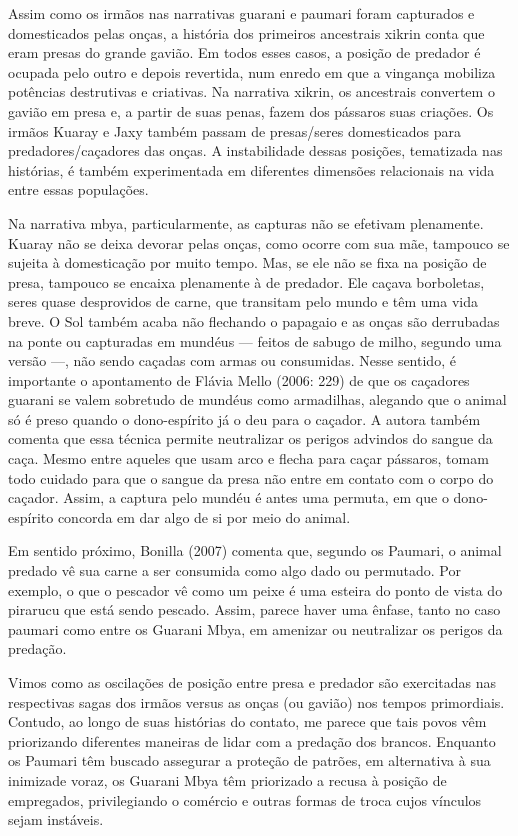 Assim como os irmãos nas narrativas guarani e paumari foram capturados e
domesticados pelas onças, a história dos primeiros ancestrais xikrin
conta que eram presas do grande gavião. Em todos esses casos, a posição
de predador é ocupada pelo outro e depois revertida, num enredo em que
a vingança mobiliza potências destrutivas e criativas. Na narrativa
xikrin, os ancestrais convertem o gavião em presa e, a partir de suas
penas, fazem dos pássaros suas criações. Os irmãos Kuaray e Jaxy também
passam de presas/seres domesticados para predadores/caçadores das
onças. A instabilidade dessas posições, tematizada nas histórias, é
também experimentada em diferentes dimensões relacionais na vida entre
essas populações. 

Na narrativa mbya, particularmente, as capturas não se efetivam
plenamente. Kuaray não se deixa devorar pelas onças, como ocorre com
sua mãe, tampouco se sujeita à domesticação por muito tempo. Mas, se
ele não se fixa na posição de presa, tampouco se encaixa plenamente à
de predador. Ele caçava borboletas, seres quase desprovidos de carne,
que transitam pelo mundo e têm uma vida breve. O Sol também acaba não
flechando o papagaio e as onças são derrubadas na ponte ou capturadas
em mundéus — feitos de sabugo de milho, segundo uma versão —, não sendo
caçadas com armas ou consumidas. Nesse sentido, é importante o
apontamento de Flávia Mello (2006: 229) de que os caçadores guarani se
valem sobretudo de mundéus como armadilhas, alegando que o animal só é
preso quando o dono-espírito já o deu para o caçador. A autora também
comenta que essa técnica permite neutralizar os perigos advindos do
sangue da caça. Mesmo entre aqueles que usam arco e flecha para caçar
pássaros, tomam todo cuidado para que o sangue da presa não entre em
contato com o corpo do caçador. Assim, a captura pelo mundéu é antes
uma permuta, em que o dono-espírito concorda em dar algo de si por meio
do animal.

Em sentido próximo, Bonilla (2007) comenta que, segundo os Paumari, o
animal predado vê sua carne a ser consumida como algo dado ou
permutado. Por exemplo, o que o pescador vê como um peixe é uma esteira
do ponto de vista do pirarucu que está sendo pescado. Assim, parece
haver uma ênfase, tanto no caso paumari como entre os Guarani Mbya, em
amenizar ou neutralizar os perigos da predação. 

Vimos como as oscilações de posição entre presa e predador são
exercitadas nas respectivas sagas dos irmãos versus as onças (ou
gavião) nos tempos primordiais. Contudo, ao longo de suas histórias do
contato, me parece que tais povos vêm priorizando diferentes maneiras
de lidar com a predação dos brancos. Enquanto os Paumari têm buscado
assegurar a proteção de patrões, em alternativa à sua inimizade voraz,
os Guarani Mbya têm priorizado a recusa à posição de empregados,
privilegiando o comércio e outras formas de troca cujos vínculos sejam
instáveis.

